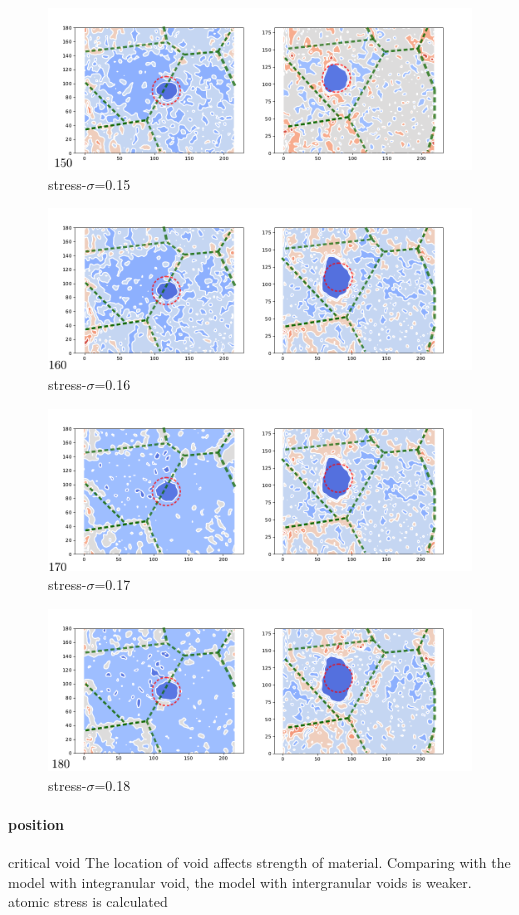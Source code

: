 \documentclass[times]{elsarticle}
\begin{document}
\begin{figure}[h]
	\centering
	\includegraphics[width=0.7\linewidth]{img/frame150}
	\caption{stress-$\sigma$=0.15}
	\label{ }
\end{figure}

\begin{figure}[h]
	\centering
	\includegraphics[width=0.7\linewidth]{img/frame160}
	\caption{stress-$\sigma$=0.16}
	\label{ }
\end{figure}

\begin{figure}[h]
	\centering
	\includegraphics[width=0.7\linewidth]{img/frame170}
	\caption{stress-$\sigma$=0.17}
	\label{ }
\end{figure}


\begin{figure}[h]
	\centering
	\includegraphics[width=0.7\linewidth]{img/frame180}
	\caption{stress-$\sigma$=0.18}
	\label{ }
\end{figure}
\paragraph{position}critical void 
The location of void affects strength of material. Comparing with the model with integranular void, the model with intergranular voids is weaker. atomic stress is calculated 
\end{document}
